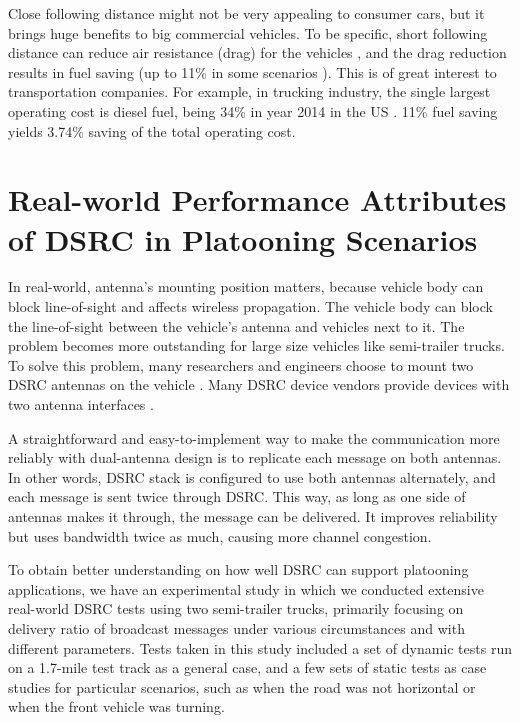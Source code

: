 \documentclass[12pt]{report}
\begin{document}
Close following distance might not be very appealing to consumer cars, but it brings huge benefits to big commercial vehicles. To be specific, short following distance can reduce air resistance (drag) for the vehicles \cite{watts2015computational,fhwa2015report}, and the drag reduction results in fuel saving (up to 11\% in some scenarios \cite{lammert2014effect}). This is of great interest to transportation companies. For example, in trucking industry, the single largest operating cost is diesel fuel, being 34\% in year 2014 in the US \cite{atri2015analysis}. 11\% fuel saving yields 3.74\% saving of the total operating cost.

\section{Real-world Performance Attributes of DSRC in Platooning Scenarios}

\label{sec:background_realworld_performance}

In real-world, antenna's mounting position matters, because vehicle body can block line-of-sight and affects wireless propagation. The vehicle body can block the line-of-sight between the vehicle's antenna and vehicles next to it. The problem becomes more outstanding for large size vehicles like semi-trailer trucks. To solve this problem, many researchers and engineers choose to mount two DSRC antennas on the vehicle \cite{Bergenhem20121222,peloton}. Many DSRC device vendors provide devices with two antenna interfaces \cite{aradasystems,denso,unex}.

A straightforward and easy-to-implement way to make the communication more reliably with dual-antenna design is to replicate each message on both antennas. In other words, DSRC stack is configured to use both antennas alternately, and each message is sent twice through DSRC. This way, as long as one side of antennas makes it through, the message can be delivered. It improves reliability but uses bandwidth twice as much, causing more channel congestion.

To obtain better understanding on how well DSRC can support platooning applications, we have an experimental study in which we conducted extensive real-world DSRC tests using two semi-trailer trucks\cite{songDSRC2016}, primarily focusing on delivery ratio of broadcast messages under various circumstances and with different parameters. Tests taken in this study included a set of dynamic tests run on a 1.7-mile test track as a general case, and a few sets of static tests as case studies for particular scenarios, such as when the road was not horizontal or when the front vehicle was turning.
\end{document}
